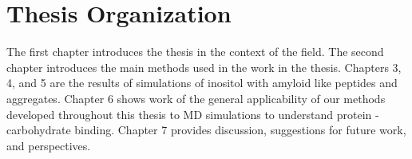 \section{Thesis Organization}
The first chapter introduces the thesis in the context of the field.  The second chapter introduces the main methods used in the work in the thesis. Chapters 3, 4, and 5 are the results of simulations of inositol with amyloid like peptides and aggregates. Chapter 6 shows work of the general applicability of our methods developed throughout this thesis to MD simulations to understand protein - carbohydrate binding. Chapter 7 provides discussion, suggestions for future work, and perspectives.









